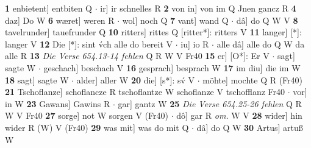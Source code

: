 \documentclass[8pt,a4paper,notitlepage]{article}
\begin{document}
\begin{table}[ht]
\begin{minipage}[t]{0.5\linewidth}
\textbf{1} enbietent] entbiten Q  $\cdot$ ir] ir schnelles R \textbf{2} von in] von im Q Jnen gancz R \textbf{4} daz] Do W \textbf{6} wæret] weren R  $\cdot$ wol] noch Q \textbf{7} vant] wand Q  $\cdot$ dâ] do Q W V \textbf{8} tavelrunder] tauefrunder Q \textbf{10} ritters] rittes Q [ritter*]: ritters V \textbf{11} langer] [*]: langer V \textbf{12} Die [*]: sint v́ch alle do bereit V  $\cdot$ iu] io R  $\cdot$ alle dâ] alle do Q W da alle R \textbf{13} \textit{Die Verse 654.13-14 fehlen} Q R W V Fr40  \textbf{15} er] [O*]: Er V  $\cdot$ sagt] sagte W  $\cdot$ geschach] beschach V \textbf{16} gesprach] besprach W \textbf{17} im diu] die im W \textbf{18} sagt] sagte W  $\cdot$ alder] aller W \textbf{20} die] [s*]: sv́ V  $\cdot$ möhte] mochte Q R (Fr40) \textbf{21} Tschoflanze] schoflancze R tschoflantze W schoflanze V tschofflanz Fr40  $\cdot$ vor] in W \textbf{23} Gawans] Gawins R  $\cdot$ gar] gantz W \textbf{25} \textit{Die Verse 654.25-26 fehlen} Q R W V Fr40  \textbf{27} sorge] not W sorgen V (Fr40)  $\cdot$ dô] gar R \textit{om.} W V \textbf{28} wider] hin wider R (W) V (Fr40) \textbf{29} was mit] was do mit Q  $\cdot$ dâ] do Q W \textbf{30} Artus] artuß W \newline
\end{minipage}
\end{table}
\end{document}
